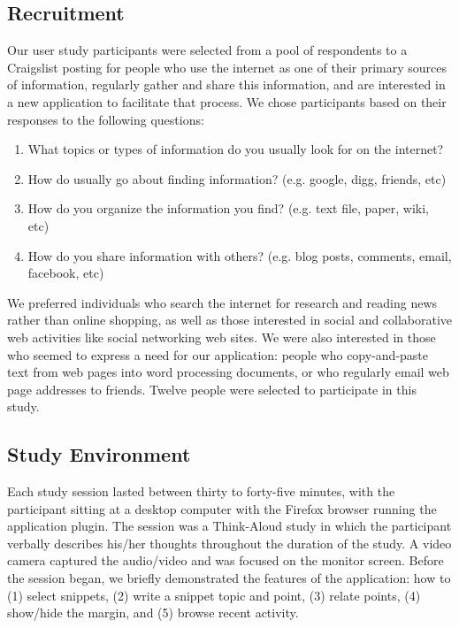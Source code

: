 \documentclass{sig-alt-release2}
\begin{document}
\subsection{Recruitment}
Our user study participants were selected from a pool of respondents to a Craigslist posting for people who use the internet as one of their primary sources of information, regularly gather and share this information, and are interested in a new application to facilitate that process. We chose participants based on their responses to the following questions:
\begin{enumerate}
	\item What topics or types of information do you usually look for on the internet?
	\item How do usually go about finding information? (e.g. google, digg, friends, etc)
	\item How do you organize the information you find? (e.g. text file, paper, wiki, etc)
	\item How do you share information with others? (e.g. blog posts, comments, email, facebook, etc)
\end{enumerate}
We preferred individuals who search the internet for research and reading news rather than online shopping, as well as those interested in social and collaborative web activities like social networking web sites.  We were also interested in those who seemed to express a need for our application: people who copy-and-paste text from web pages into word processing documents, or who regularly email web page addresses to friends. Twelve people were selected to participate in this study.

\subsection{Study Environment}
Each study session lasted between thirty to forty-five minutes, with the participant sitting at a desktop computer with the Firefox browser running the application plugin. The session was a Think-Aloud study in which the participant verbally describes his/her thoughts throughout the duration of the study. A video camera captured the audio/video and was focused on the monitor screen. Before the session began, we briefly demonstrated the features of the application: how to (1) select snippets, (2) write a snippet topic and point, (3) relate points, (4) show/hide the margin, and (5) browse recent activity.
\end{document}

